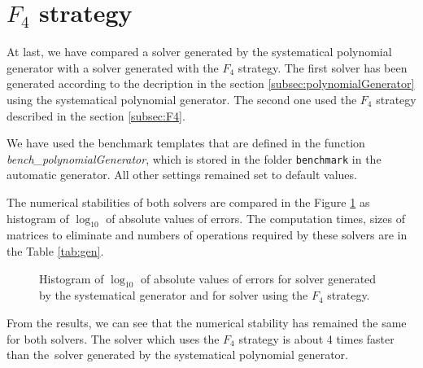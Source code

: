 \section{$F_4$ strategy}
\label{exp:gen}
At last, we have compared a solver generated by the systematical polynomial generator with a solver generated with the $F_4$ strategy. The first solver has been generated according to the decription in the section \ref{subsec:polynomialGenerator} using the systematical polynomial generator. The second one used the $F_4$ strategy described in the section \ref{subsec:F4}.

We have used the benchmark templates that are defined in the function \textit{bench\_poly\-nomialGenerator}, which is stored in the folder \texttt{benchmark} in the automatic generator. All other settings remained set to default values.

The numerical stabilities of both solvers are compared in the Figure \ref{graph:gen} as histogram of $\log_{10}$ of absolute values of errors. The computation times, sizes of matrices to eliminate and numbers of operations required by these solvers are in the Table \ref{tab:gen}.

\begin{figure}[ht]
  \centering
  \resizebox{0.95\textwidth}{!}{}
  \caption{Histogram of $\log_{10}$ of absolute values of errors for solver generated by the systematical generator and for solver using the $F_4$ strategy.}
  \label{graph:gen}
\end{figure}

From the results, we can see that the numerical stability has remained the same for both solvers. The solver which uses the $F_4$ strategy is about 4 times faster than the~solver generated by the systematical polynomial generator.

